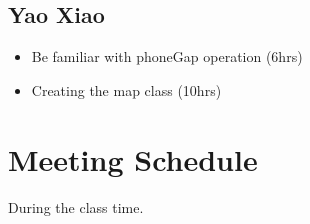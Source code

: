 \documentclass[12pt]{article}
\begin{document}
\subsection*{Yao Xiao}
\begin{itemize}
\item Be familiar with phoneGap operation (6hrs)
\item Creating the map class   (10hrs)

\end{itemize}






\section*{Meeting Schedule}
During the class time.
\end{document}
